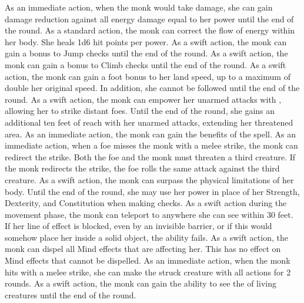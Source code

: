     As an immediate action, when the monk would take  damage, she can gain damage reduction against all energy damage equal to her \ki power until the end of the round.
    As a standard action, the monk can correct the flow of energy within her body.
    She heals 1d6 hit points per \ki power.
    As a swift action, the monk can gain a  bonus to Jump checks until the end of the round.
    As a swift action, the monk can gain a  bonus to Climb checks until the end of the round.
    As a swift action, the monk can gain a  foot bonus to her land speed, up to a maximum of double her original speed.
    In addition, she cannot be followed until the end of the round.
    As a swift action, the monk can empower her unarmed attacks with \ki, allowing her to strike distant foes.
    Until the end of the round, she gains an additional ten feet of reach with her unarmed attacks, extending her threatened area.
    As an immediate action, the monk can gain the benefits of the  spell.
    As an immediate action, when a foe misses the monk with a melee strike, the monk can redirect the strike.
    Both the foe and the monk must threaten a third creature.
    If the monk redirects the strike, the foe rolls the same attack against the third creature.
    As a swift action, the monk can surpass the physical limitations of her body.
    Until the end of the round, she may use her \ki power in place of her Strength, Dexterity, and Constitution when making checks.
    As a swift action during the movement phase, the monk can teleport to anywhere she can see within 30 feet.
    If her line of effect is blocked, even by an invisible barrier, or if this would somehow place her inside a solid object, the ability fails.
    As a swift action, the monk can dispel all Mind effects that are affecting her.
    This has no effect on Mind effects that cannot be dispelled.
    As an immediate action, when the monk hits with a melee strike, she can make the struck creature \impaired with all actions for 2 rounds.
    As a swift action, the monk can gain the ability to see the \ki of living creatures until the end of the round.
